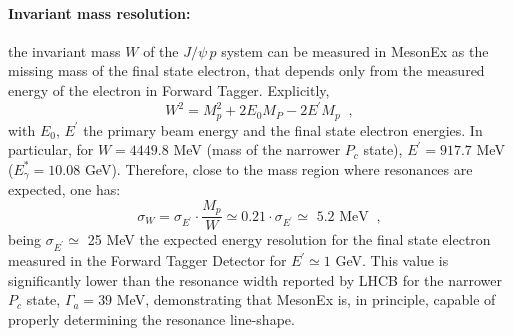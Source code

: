 \paragraph{Invariant mass resolution: } the invariant mass $W$ of the $J/\psi\, p$ system can be measured in MesonEx as the missing mass of the final state electron, that depends only from the measured energy of the electron in Forward Tagger. Explicitly,
\begin{equation}
W^2=M_p^2+2E_0M_P-2E^{\prime}M_p \; \; ,
\end{equation}
with $E_0$, $E^{\prime}$ the primary beam energy and the final state electron energies. In particular, for $W=4449.8$ MeV (mass of the narrower $P_c$ state), $E^{\prime}=917.7$ MeV ($E^*_{\gamma}=10.08$ GeV).
Therefore, close to the mass region where resonances are expected, one has:
\begin{equation}
\sigma_W=\sigma_{E^{\prime}} \cdot \frac{M_p}{W} \simeq 0.21 \cdot \sigma_{E^{\prime}} \simeq \mbox{ 5.2 MeV}\; \; ,
\end{equation}  
being $\sigma_{E^{\prime}} \simeq$ 25 MeV the expected energy resolution for the final state electron measured in the Forward Tagger Detector \cite{Celentano:2014boa} for $E^\prime \simeq 1$ GeV. 
This value is significantly lower than the resonance width reported by LHCB for the narrower $P_c$ state, $\Gamma_a=39$ MeV, demonstrating that MesonEx is, in principle, capable of properly determining the resonance line-shape.
